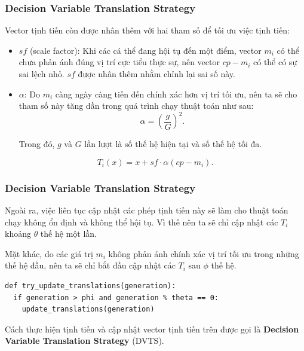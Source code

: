 \begin{frame}[fragile]
\frametitle{Decision Variable Translation Strategy}
Vector tịnh tiến còn được nhân thêm với hai tham số để tối ưu việc tịnh tiến:
\begin{itemize}
\item \( sf \) (scale factor): Khi các cá thể đang hội tụ đến một điểm, vector
  \( m_{i} \) có thể chưa phản ánh đúng vị trí cực tiểu thực sự, nên vector \(
  cp-m_{i} \) có thể có sự sai lệch nhỏ. \( sf \) được nhân thêm nhằm chỉnh lại
  sai số này.

\item \( \alpha \): Do \( m_{i} \) càng ngày càng tiến đến chính xác hơn vị trí
  tối ưu, nên ta sẽ cho tham số này tăng dần trong quá trình chạy thuật toán như
  sau:
  \[
    \alpha = \left( \frac{g}{G} \right) ^2
  .\]

  Trong đó, \( g \) và \( G \) lần lượt là số thế hệ hiện tại và số thế hệ tối
  đa.
\end{itemize}
\[
  T_{i}(x) = x + sf \cdot \alpha(cp - m_{i})
.\] 
\end{frame}

\begin{frame}[fragile]
\frametitle{Decision Variable Translation Strategy}
Ngoài ra, việc liên tục cập nhật các phép tịnh tiến này sẽ làm cho thuật toán
chạy không ổn định và không thể hội tụ. Vì thế nên ta sẽ chỉ cập nhật các \(
T_{i} \) khoảng \( \theta \) thế hệ một lần.

Mặt khác, do các giá trị \( m_{i} \) không phản ánh chính xác vị trí tối ưu trong
những thế hệ đầu, nên ta sẽ chỉ bắt đầu cập nhật các \( T_{i} \) sau \( \phi \)
thế hệ.

\begin{verbatim}
def try_update_translations(generation):
  if generation > phi and generation % theta == 0:
    update_translations(generation)
\end{verbatim}

Cách thực hiện tịnh tiến và cập nhật vector tịnh tiến trên được gọi là
\textbf{Decision Variable Translation Strategy} (DVTS).
\end{frame}

